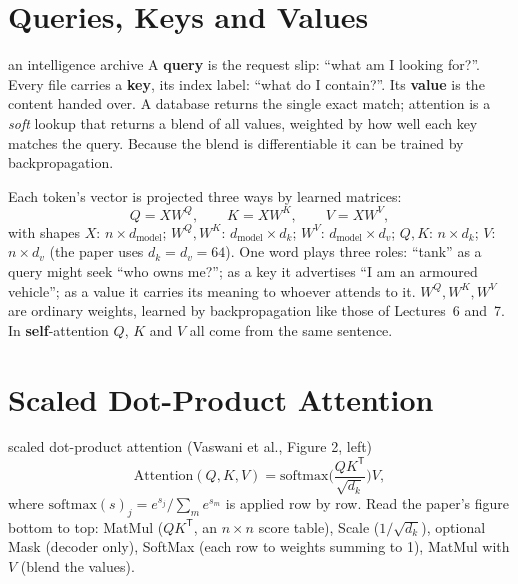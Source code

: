 \documentclass[11pt]{article}
\begin{document}
\section{Queries, Keys and Values}
\begin{intuition}{an intelligence archive}
A \textbf{query} is the request slip: ``what am I looking for?''. Every file carries a \textbf{key}, its index label: ``what do I contain?''. Its \textbf{value} is the content handed over. A database returns the single exact match; attention is a \emph{soft} lookup that returns a blend of all values, weighted by how well each key matches the query. Because the blend is differentiable it can be trained by backpropagation.
\end{intuition}
Each token's vector is projected three ways by learned matrices:
\[Q=XW^Q,\qquad K=XW^K,\qquad V=XW^V,\]
with shapes $X$: $n\times d_{\text{model}}$; $W^Q,W^K$: $d_{\text{model}}\times d_k$; $W^V$: $d_{\text{model}}\times d_v$; $Q,K$: $n\times d_k$; $V$: $n\times d_v$ (the paper uses $d_k=d_v=64$). One word plays three roles: ``tank'' as a query might seek ``who owns me?''; as a key it advertises ``I am an armoured vehicle''; as a value it carries its meaning to whoever attends to it. $W^Q,W^K,W^V$ are ordinary weights, learned by backpropagation like those of Lectures~6 and~7. In \textbf{self}-attention $Q$, $K$ and $V$ all come from the same sentence.

\section{Scaled Dot-Product Attention}\label{sec:sdpa}
\begin{definition}{scaled dot-product attention (Vaswani et al., Figure 2, left)}
\[\text{Attention}(Q,K,V)=\text{softmax}\!\Big(\frac{QK^{\mathsf T}}{\sqrt{d_k}}\Big)V,\]
where $\text{softmax}(s)_j=e^{s_j}/\sum_m e^{s_m}$ is applied row by row.
Read the paper's figure bottom to top: MatMul ($QK^{\mathsf T}$, an $n\times n$ score table), Scale ($1/\sqrt{d_k}$), optional Mask (decoder only), SoftMax (each row to weights summing to 1), MatMul with $V$ (blend the values).
\end{definition}
\end{document}
